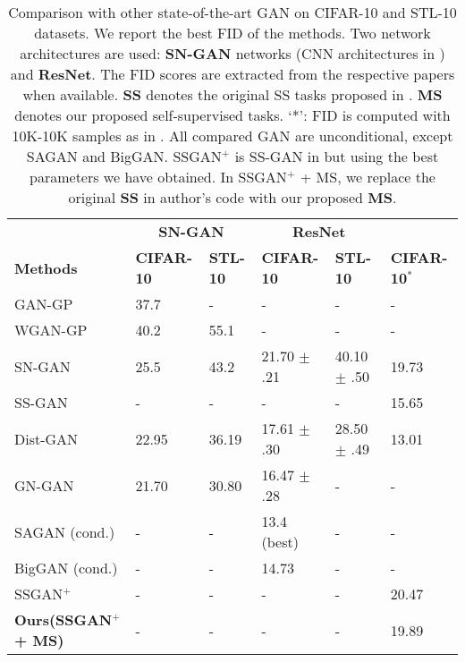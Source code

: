 \documentclass{article}
\begin{document}
\begin{table}
  \small
  \caption{Comparison with other state-of-the-art GAN on CIFAR-10 and STL-10 datasets. 
  We report the best FID of the methods.
  Two network architectures are used: {\bf SN-GAN} networks (CNN architectures in \cite{miyato-iclr-2018}) and {\bf ResNet}.
  The FID scores are extracted from the respective papers when available.
  {\bf SS} denotes the original SS tasks proposed in \cite{chen-arxiv-2018}. {\bf MS} denotes our proposed self-supervised tasks. 
  `*': FID is computed with 10K-10K samples as in \cite{chen-arxiv-2018}. All compared GAN are unconditional, except SAGAN and BigGAN.
  SSGAN$^+$ is SS-GAN in \cite{chen-arxiv-2018} but using the best parameters we have obtained. 
  In SSGAN$^+$ + MS, we replace the original {\bf SS} in author's code with our proposed {\bf MS}.}

  \label{state_of_the_art}
  \centering
  \begin{tabular}{llllll}
    \toprule
    & \multicolumn{2}{c}{\textbf{SN-GAN}} & \multicolumn{2}{c}{\textbf{ResNet}} \\
    \cmidrule(r){2-3}  \cmidrule(r){4-6}
    \textbf{Methods}  & \textbf{CIFAR-10}     & \textbf{STL-10}     & \textbf{CIFAR-10}   & \textbf{STL-10}  & \textbf{CIFAR-10$ ^*$}\\
    \midrule
    GAN-GP \cite{miyato-iclr-2018}    			      & 37.7   & -      & - & - & - \\
    WGAN-GP \cite{miyato-iclr-2018}    			      & 40.2   & 55.1   & - & - & - \\
    SN-GAN \cite{miyato-iclr-2018}    			      & 25.5   & 43.2   & 21.70 $\pm$ .21 & 40.10 $\pm$ .50  & 19.73 \\
SS-GAN \cite{chen-arxiv-2018}                     & -      & -      & -               & -               & 15.65 \\
    Dist-GAN \cite{tran-eccv-2018}  			      & 22.95  & 36.19  & 17.61 $\pm$ .30 & 28.50 $\pm$ .49  & 13.01 \\
    GN-GAN \cite{tran-aaai-2018}                      & 21.70  & 30.80  & 16.47 $\pm$ .28 & - & - \\
    \hline
    SAGAN \cite{zhang-arxiv-2018} (cond.)             & -  & -  & 13.4 (best) & - & - \\
    BigGAN \cite{brock-iclr-2018} (cond.)             & -  & -  & 14.73       & - & - \\
    \hline
    SSGAN$^+$                                         & -  & -  & -  & -  & 20.47 \\
    \textbf{Ours(SSGAN$^+$ + MS)}                     & -  & -  & -  & -  & 19.89 \\
    \hline


\end{tabular}
\end{table}
\end{document}
